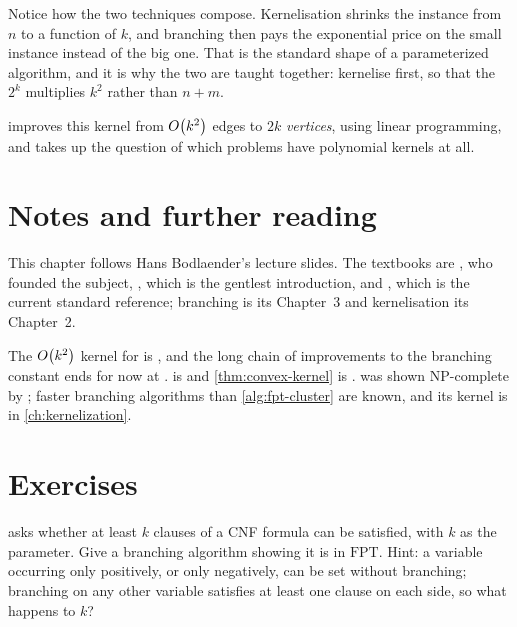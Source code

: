 \begin{intuition}
Notice how the two techniques compose. Kernelisation shrinks the instance from
$n$ to a function of $k$, and branching then pays the exponential price on the
small instance instead of the big one. That is the standard shape of a
parameterized algorithm, and it is why the two are taught together: kernelise
first, so that the $2^k$ multiplies $k^2$ rather than $n+m$.

 improves this kernel from $O\!\left(k^2\right)$ edges to $2k$
\emph{vertices}, using linear programming, and takes up the question of which
problems have polynomial kernels at all.
\end{intuition}

\section{Notes and further reading}
\label{sec:fpt-i-further-reading}

This chapter follows Hans Bodlaender's lecture slides. The textbooks are
\citet{DowneyFellows2013}, who founded the subject,
\citet{Niedermeier2006}, which is the gentlest introduction, and
\citet{CyganEtAl2015}, which is the current standard reference; branching is its
Chapter~3 and kernelisation its Chapter~2.

The $O\!\left(k^2\right)$ kernel for  is \citet{BussGoldsmith1993},
and the long chain of improvements to the branching constant ends for now at
\citet{ChenKanjXia2010}.  is
\citet{GrammNiedermeierRossmanith2003} and \cref{thm:convex-kernel} is
\citet{MoranSnir2005}.  was shown
\textrm{NP}-complete by \citet{ShamirSharanTsur2002}; faster branching
algorithms than \cref{alg:fpt-cluster} are known, and its kernel is in
\cref{ch:kernelization}.

\section{Exercises}
\label{sec:ex-fpt-i}

\begin{exercise}
 asks whether at least $k$ clauses of a CNF formula can be
satisfied, with $k$ as the parameter. Give a branching algorithm showing it is
in $\mathrm{FPT}$. Hint: a variable occurring only positively, or only
negatively, can be set without branching; branching on any other variable
satisfies at least one clause on each side, so what happens to $k$?
\end{exercise}

